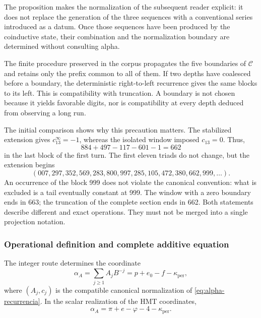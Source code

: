 The proposition makes the normalization of the subsequent reader explicit: it does not
replace the generation of the three sequences with a conventional series
introduced as a datum. Once those sequences have been produced by the coinductive
state, their combination and the normalization boundary are
determined without consulting alpha.

The finite procedure preserved in the corpus propagates the five
boundaries of \(\mathcal C\) and retains only the prefix common to
all of them. If two depths have coalesced before a boundary,
the deterministic right-to-left recurrence gives the same blocks
to its left. This is compatibility with truncation. A
boundary is not chosen because it yields favorable digits, nor is
compatibility at every depth deduced from observing a long run.

The initial comparison shows why this precaution matters. The
stabilized extension gives \(c_{13}^{\infty}=-1\), whereas
the isolated window imposed \(c_{13}=0\). Thus,
\[
 884+497-117-601-1=662
\]
in the last block of the first turn. The first eleven triads do not
change, but the extension begins
\[
 (007,297,352,569,283,800,997,285,105,472,380,662,999,\ldots).
\]
An occurrence of the block 999 does not violate the canonical convention: what
is excluded is a tail eventually constant at 999. The window with a
zero boundary ends in 663; the truncation of the complete section
ends in 662. Both statements describe different and
exact operations. They must not be merged into a single projection notation.

\subsubsection{Operational definition and complete additive equation}
\label{subsec:alpha-definicion}

\begin{definition}
\label{def:alpha-operativa}
The integer route determines the coordinate
\begin{equation}
 \alpha_A=\sum_{j\geq1}A_jB^{-j}
 =p+e_0-f-\kappa_{\mathrm{per}},
 \label{eq:alpha-via-a}
\end{equation}
where \((A_j,c_j)\) is the compatible canonical normalization of
\eqref{eq:alpha-recurrencia}. In the scalar realization of the
HMT coordinates,
\begin{equation}
 \boxed{\alpha_A=
 \pi+e-\varphi
 -4-\kappa_{\mathrm{per}}.}
 \label{eq:alpha-identidad-completa}
\end{equation}
\end{definition}


